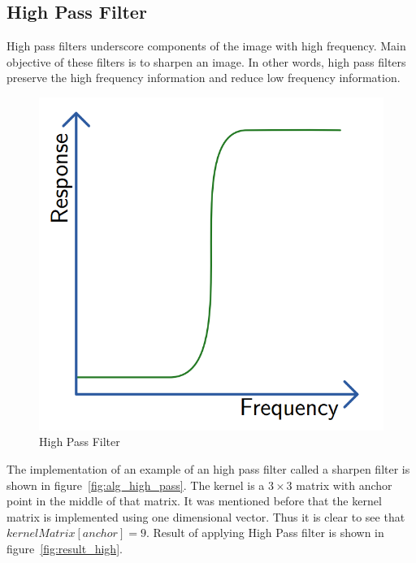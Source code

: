\documentclass{article}
\begin{document}
\subsection{High Pass Filter}

High pass filters underscore components of the image with high frequency. Main objective of these filters is to sharpen an image. In other words, high pass filters preserve the high frequency information and reduce low frequency information.

%
% 
%
\begin{figure}[H]
\centering

  \includegraphics[width=0.5\linewidth]{res/high_pass_graph.png}
  
\caption{High Pass Filter}
\label{fig:high_pass_graph}
\end{figure}


The implementation of an example of an high pass filter called a sharpen filter is shown in figure~\ref{fig:alg_high_pass}.  The kernel is a $3 \times 3$ matrix with anchor point in the middle of that matrix. It was mentioned before that the kernel matrix is implemented using one dimensional vector. Thus it is clear to see that $kernelMatrix[anchor] = 9$. Result of applying High Pass filter is shown in figure~\ref{fig:result_high}.
\end{document}

